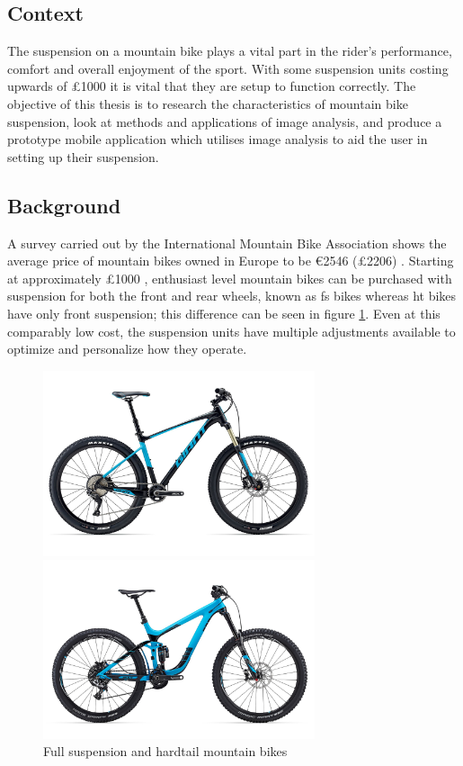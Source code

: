 \subsection{Context}
	The suspension on a mountain bike plays a vital part in the rider's performance, comfort and overall enjoyment of the sport. With some suspension units costing upwards of \pounds1000 it is vital that they are setup to function correctly. The objective of this thesis is to research the characteristics of mountain bike suspension, look at methods and applications of image analysis, and produce a prototype mobile application which utilises image analysis to aid the user in setting up their suspension.
\subsection{Background}
	A survey carried out by the International Mountain Bike Association shows the average price of mountain bikes owned in Europe to be \euro2546 (\pounds2206) \citep{imbasurv}. Starting at approximately \pounds1000 \citep{giantstance}, enthusiast level mountain bikes can be purchased with suspension for both the front and rear wheels, known as \gls{fs} bikes whereas \gls{ht} bikes have only front suspension; this difference can be seen in figure \ref{fig:fsandht}. Even at this comparably low cost, the suspension units have multiple adjustments available to optimize and personalize how they operate.
	\begin{figure}[h!]
		\centering
		\begin{minipage}{0.45\textwidth}
			\centering
			\includegraphics[width=8cm]{../images/2017_GIANT_FATHOM_1.jpg}
		\end{minipage}\hfill
		\begin{minipage}{0.45\textwidth}
			\centering
			\includegraphics[width=8cm]{../images/2016_Giant_Reign_Advanced_275_0.jpg}
		\end{minipage}
		\caption{Full suspension and hardtail mountain bikes \citep{giantfathom,giantreign}}
		\label{fig:fsandht}
	\end{figure}
